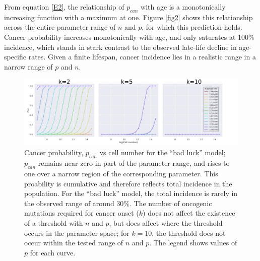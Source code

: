 \documentclass[12pt,onecolumn,twoside]{article}
\begin{document}
From equation \ref{E2}, the relationship of $p_{can}$ with age is a monotonically increasing function with a maximum at one. Figure \ref{fig2} shows this relationship across the entire parameter range of $n$ and $p$, for which this prediction holds. Cancer probability increases monotonically with age, and only saturates at 100\% incidence, which stands in stark contrast to the observed late-life decline in age-specific rates. Given a finite lifespan, cancer incidence lies in a realistic range in a narrow range of $p$ and $n$.
\begin{figure}[!th]
	\centering
	\includegraphics[width=\linewidth]{fig1.png}
	\caption{ Cancer probability, $p_{can}$ vs cell number for the ``bad luck'' model; $p_{can}$ remains near zero in part of the parameter range, and rises to one over a narrow region of the corresponding parameter. This proability is cumulative and therefore reflects total incidence in the population. For the ``bad luck'' model, the total incidence is rarely in the observed range of around 30\%. The number of oncogenic mutations required for cancer onset ($k$) does not affect the existence of a threshold with $n$ and $p$, but does affect where the threshold occurs in the parameter space; for $k=10$, the threshold does not occur within the tested range of $n$ and $p$. The legend shows values of $p$ for each curve.}
	\label{fig1}
\end{figure}
\end{document}
